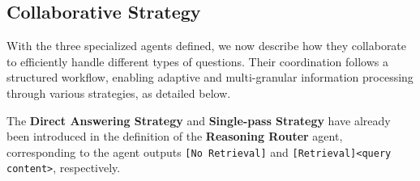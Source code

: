 \subsection{Collaborative Strategy}\label{sec:strategy}

With the three specialized agents defined, we now describe how they collaborate to efficiently handle different types of questions. 
Their coordination follows a structured workflow, enabling adaptive and multi-granular information processing through various strategies, as detailed below.

The \textbf{Direct Answering Strategy} and \textbf{Single-pass Strategy} have already been introduced in the definition of the \textbf{Reasoning Router} agent, corresponding to the agent outputs \texttt{[No Retrieval]} and \texttt{[Retrieval]<query content>}, respectively.



